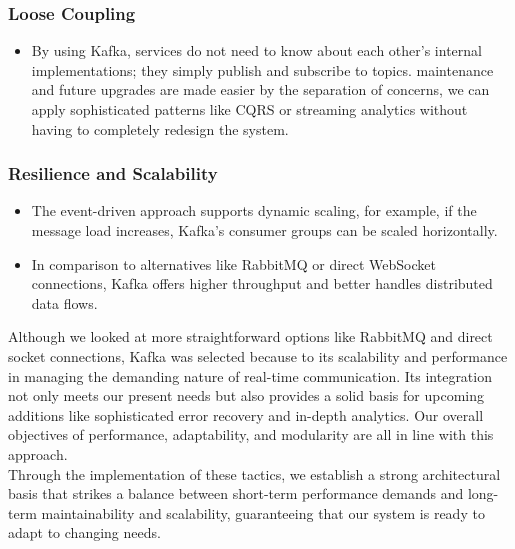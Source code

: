 \documentclass{FastFyp}
\begin{document}
\subsubsection{Loose Coupling}
    \begin{itemize}
        \item By using Kafka, services do not need to know about each other’s internal implementations; they simply publish and subscribe to topics.
        \itemBecause maintenance and future upgrades are made easier by the separation of concerns, we can apply sophisticated patterns like CQRS or streaming analytics without having to completely redesign the system.
    \end{itemize}
\subsubsection{Resilience and Scalability}
    \begin{itemize}
        \item The event-driven approach supports dynamic scaling, for example, if the message load increases, Kafka’s consumer groups can be scaled horizontally.
        \item In comparison to alternatives like RabbitMQ or direct WebSocket connections, Kafka offers higher throughput and better handles distributed data flows.
    \end{itemize}

Although we looked at more straightforward options like RabbitMQ and direct socket connections, Kafka was selected because to its scalability and performance in managing the demanding nature of real-time communication. Its integration not only meets our present needs but also provides a solid basis for upcoming additions like sophisticated error recovery and in-depth analytics. Our overall objectives of performance, adaptability, and modularity are all in line with this approach. \\
Through the implementation of these tactics, we establish a strong architectural basis that strikes a balance between short-term performance demands and long-term maintainability and scalability, guaranteeing that our system is ready to adapt to changing needs.
\end{document}
